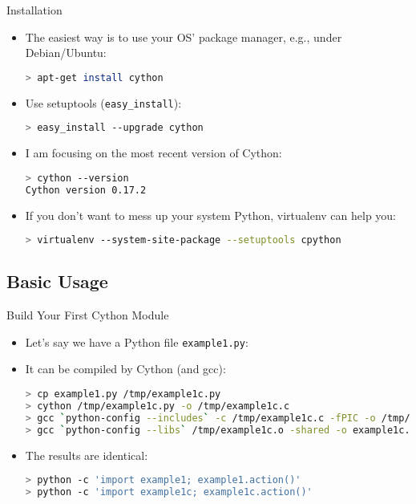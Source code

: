 \documentclass[dvips,xcolor=pst,14pt]{beamer}
\begin{document}
\begin{frame}[fragile]{
%
Installation
%
}
\begin{itemize}
\item The easiest way is to use your OS' package manager, e.g., under
Debian/Ubuntu:
\begin{lstlisting}[language=bash]
> apt-get install cython
\end{lstlisting}
\item Use setuptools (\verb+easy_install+):
\begin{lstlisting}[language=bash]
> easy_install --upgrade cython
\end{lstlisting}
\item I am focusing on the most recent version of Cython:
\begin{lstlisting}[language=bash]
> cython --version
Cython version 0.17.2
\end{lstlisting}
\item If you don't want to mess up your system Python, virtualenv can help you:
\begin{lstlisting}[basicstyle=\scriptsize\ttfamily,language=bash]
> virtualenv --system-site-package --setuptools cpython
\end{lstlisting}
\end{itemize}
\end{frame}

\subsection{
Basic Usage
}

\begin{frame}[fragile]{
%
Build Your First Cython Module
%
}
\begin{itemize}
\item Let's say we have a Python file {\color{red}\verb+example1.py+}:

\item It can be compiled by Cython (and gcc):
\begin{lstlisting}[basicstyle=\scriptsize\ttfamily,language=bash]
> cp example1.py /tmp/example1c.py
> cython /tmp/example1c.py -o /tmp/example1c.c
> gcc `python-config --includes` -c /tmp/example1c.c -fPIC -o /tmp/example1c.o
> gcc `python-config --libs` /tmp/example1c.o -shared -o example1c.so
\end{lstlisting}
\item The results are identical:
\begin{lstlisting}[basicstyle=\scriptsize\ttfamily,language=bash]
> python -c 'import example1; example1.action()'
> python -c 'import example1c; example1c.action()'
\end{lstlisting}
\end{itemize}
\end{frame}
\end{document}
